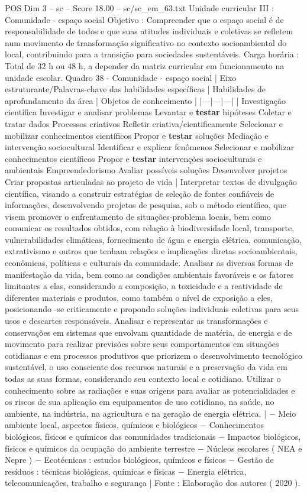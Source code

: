 \begin{textsample}{POS Dim 3 – sc – Score 18.00 – sc/sc\_em\_63.txt}
Unidade curricular III : Comunidade - espaço social Objetivo : Compreender que o espaço social é de responsabilidade de todos e que suas atitudes individuais e coletivas se refletem num movimento de transformação significativo no contexto socioambiental do local, contribuindo para a transição para sociedades sustentáveis.
Carga horária : Total de 32 h ou 48 h, a depender da matriz curricular em funcionamento na unidade escolar.
Quadro 38 - Comunidade - espaço social | Eixo estruturante/Palavras-chave das habilidades específicas | Habilidades de aprofundamento da área | Objetos de conhecimento | |---|---|---| | Investigação científica Investigar e analisar problemas Levantar e \textbf{testar} hipóteses Coletar e tratar dados Processos criativos Refletir criativa/cientificamente Selecionar e mobilizar conhecimentos científicos Propor e \textbf{testar} soluções Mediação e intervenção sociocultural Identificar e explicar fenômenos Selecionar e mobilizar conhecimentos científicos Propor e \textbf{testar} intervenções socioculturais e ambientais Empreendedorismo Avaliar possíveis soluções Desenvolver projetos Criar propostas articuladas ao projeto de vida | Interpretar textos de divulgação científica, visando a construir estratégias de seleção de fontes confiáveis de informações, desenvolvendo projetos de pesquisa, sob o método científico, que visem promover o enfrentamento de situações-problema locais, bem como comunicar os resultados obtidos, com relação à biodiversidade local, transporte, vulnerabilidades climáticas, fornecimento de água e energia elétrica, comunicação, extrativismo e outros que tenham relações e implicações diretas socioambientais, econômicas, políticas e culturais da comunidade.
Analisar as diversas formas de manifestação da vida, bem como as condições ambientais favoráveis e os fatores limitantes a elas, considerando a composição, a toxicidade e a reatividade de diferentes materiais e produtos, como também o nível de exposição a eles, posicionando -se criticamente e propondo soluções individuais coletivas para seus usos e descartes responsáveis.
Analisar e representar as transformações e conservações em sistemas que envolvam quantidade de matéria, de energia e de movimento para realizar previsões sobre seus comportamentos em situações cotidianas e em processos produtivos que priorizem o desenvolvimento tecnológico sustentável, o uso consciente dos recursos naturais e a preservação da vida em todas as suas formas, considerando seu contexto local e cotidiano.
Utilizar o conhecimento sobre as radiações e suas origens para avaliar as potencialidades e os riscos de sua aplicação em equipamentos de uso cotidiano, na saúde, no ambiente, na indústria, na agricultura e na geração de energia elétrica. | − Meio ambiente local, aspectos físicos, químicos e biológicos − Conhecimentos biológicos, físicos e químicos das comunidades tradicionais − Impactos biológicos, físicos e químicos da ocupação do ambiente terrestre − Núcleos escolares ( NEA e Nepre ) − Ecotécnicas : estudos biológicos, químicos e físicos − Gestão de resíduos : técnicas biológicas, químicas e físicas − Energia elétrica, telecomunicações, trabalho e segurança | Fonte : Elaboração dos autores ( 2020 ).

\end{textsample}
